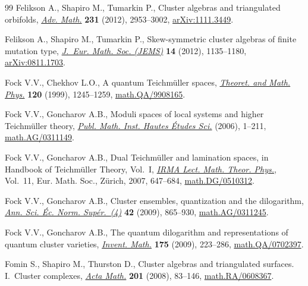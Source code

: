 \documentclass[10pt,a4paper]{amsart}
\numberwithin{equation}{section}
\begin{document}
\begin{thebibliography}{99}
Felikson A., Shapiro M., Tumarkin P., Cluster algebras and triangulated
 orbifolds, \href{https://doi.org/10.1016/j.aim.2012.07.032}{\textit{Adv. Math.}} \textbf{231} (2012), 2953--3002,
 \href{https://arxiv.org/abs/1111.3449}{arXiv:1111.3449}.

Felikson A., Shapiro M., Tumarkin P., Skew-symmetric cluster algebras of finite
 mutation type, \href{https://doi.org/10.4171/JEMS/329}{\textit{J.~Eur. Math. Soc. (JEMS)}} \textbf{14} (2012),
 1135--1180, \href{https://arxiv.org/abs/0811.1703}{arXiv:0811.1703}.

Fock V.V., Chekhov L.O., A quantum {T}eichm\"{u}ller spaces, \href{https://doi.org/10.1007/BF02557246}{\textit{Theoret.
 and Math. Phys.}} \textbf{120} (1999), 1245--1259, \href{https://arxiv.org/abs/math.QA/9908165}{math.QA/9908165}.

Fock V.V., Goncharov A.B., Moduli spaces of local systems and higher
 {T}eichm\"{u}ller theory, \href{https://doi.org/10.1007/s10240-006-0039-4}{\textit{Publ. Math. Inst. Hautes \'{E}tudes Sci.}}
 (2006), 1--211, \href{https://arxiv.org/abs/math.AG/0311149}{math.AG/0311149}.

Fock V.V., Goncharov A.B., Dual {T}eichm\"{u}ller and lamination spaces, in
 Handbook of {T}eichm\"{u}ller Theory, {V}ol.~{I}, \href{https://doi.org/10.4171/029-1/16}{\textit{IRMA Lect. Math.
 Theor. Phys.}}, Vol.~11, Eur. Math. Soc., Z\"{u}rich, 2007, 647--684,
 \href{https://arxiv.org/abs/math.DG/0510312}{math.DG/0510312}.

Fock V.V., Goncharov A.B., Cluster ensembles, quantization and the dilogarithm,
 \href{https://doi.org/10.1007/978-0-8176-4745-2_15}{\textit{Ann. Sci. \'{E}c. Norm. Sup\'{e}r.~(4)}} \textbf{42} (2009), 865--930,
 \href{https://arxiv.org/abs/math.AG/0311245}{math.AG/0311245}.

Fock V.V., Goncharov A.B., The quantum dilogarithm and representations of
 quantum cluster varieties, \href{https://doi.org/10.1007/s00222-008-0149-3}{\textit{Invent. Math.}} \textbf{175} (2009),
 223--286, \href{https://arxiv.org/abs/math.QA/0702397}{math.QA/0702397}.

Fomin S., Shapiro M., Thurston D., Cluster algebras and triangulated surfaces.
 {I}.~{C}luster complexes, \href{https://doi.org/10.1007/s11511-008-0030-7}{\textit{Acta Math.}} \textbf{201} (2008), 83--146,
 \href{https://arxiv.org/abs/math.RA/0608367}{math.RA/0608367}.


\end{thebibliography}
\end{document}
